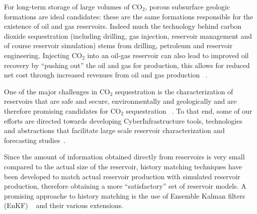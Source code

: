\documentclass[a4paper,10pt]{article}
\begin{document}
For long-term storage of large volumes of CO$_2$, porous subsurface geologic formations are ideal 
candidates: these are the same formations responsible for the existence of oil and gas reservoirs. 
Indeed much the technology behind carbon dioxide sequestration (including drilling, gas injection, 
reservoir management and of course reservoir simulation) stems from drilling, petroleum and 
reservoir engineering. Injecting CO$_2$ into an oil-gas reservoir can also lead to improved oil 
recovery by ``pushing out'' the oil and gas for production, this allows for reduced net cost 
through increased revenues from oil and gas production ~\cite{EORBook}.


One of the major challenges in CO$_2$ sequestration is the characterization of reservoirs that are 
safe and secure, environmentally and geologically and are therefore promising candidates for CO$_2$ 
sequestration ~\cite{GeoRPT,Luigi,Pruess2004,Pawar}. To that end, some of our efforts are directed towards 
developing CyberInfrastructure tools, technologies and abstractions that facilitate large scale 
reservoir characterization and forecasting studies~\cite{gmac,Elkhamra2009,MSEScience,TG10yye00}.

Since the amount of information obtained directly from reservoirs is very small compared to the 
actual size of the reservoir, history matching techniques have been developed to match actual 
reservoir production with simulated reservoir production, therefore obtaining a more 
``satisfactory'' set of reservoir models. A promising approache to history matching is 
the use of Ensemble Kalman filters (EnKF) ~\cite{KalmanPaper, DO2007, LiEnKF07, DO2006,Burger98}
and their various extensions.
\end{document}
